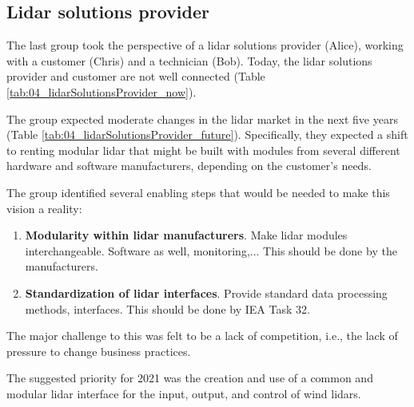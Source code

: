 \subsection{Lidar solutions provider}
The last group took the perspective of a lidar solutions provider (Alice), working with a customer (Chris) and a technician (Bob). Today, the lidar solutions provider and customer are not well connected (Table \ref{tab:04_lidarSolutionsProvider_now}).

The group expected moderate changes in the lidar market in the next five years (Table \ref{tab:04_lidarSolutionsProvider_future}). Specifically, they expected a shift to renting modular lidar that might be built with modules from several different hardware and software manufacturers, depending on the customer's needs.

The group identified several enabling steps that would be needed to make
this vision a reality:

\begin{enumerate}
\item
  \textbf{Modularity within lidar manufacturers}. Make lidar modules
  interchangeable. Software as well, monitoring,... This should be done
  by the manufacturers.
\item
  \textbf{Standardization of lidar interfaces}. Provide standard data
  processing methods, interfaces. This should be done by IEA Task 32.
\end{enumerate}

The major challenge to this was felt to be a lack of competition, i.e., the lack of pressure to change business practices.

The suggested priority for 2021 was the creation and use of a common and modular lidar interface for the input, output, and control of wind lidars.
